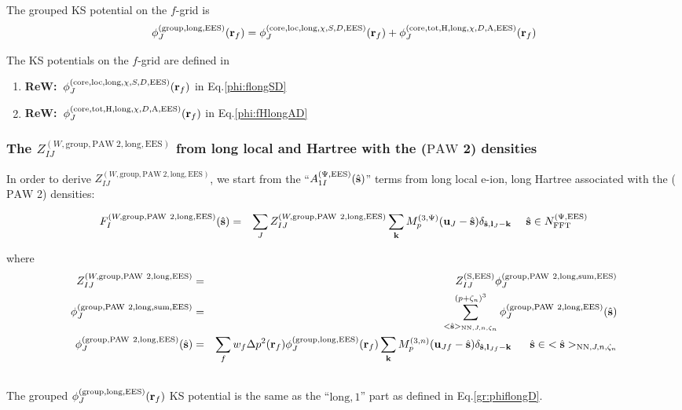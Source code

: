 \documentclass[paper=a4, fontsize=11pt]{article} %
\numberwithin{equation}{section} %
\numberwithin{figure}{section} %
\numberwithin{table}{section} %
\newcommand{\bu}{{\bf{u}}}
\newcommand{\bl}{{\bf{l}}}
\newcommand{\bk}{{\bf{k}}}
\newcommand{\bs}{{\bf{s}}}
\newcommand{\br}{{\bf{r}}}
\newcommand{\hs}{{\hat{\bf{s}}}}
\newcommand{\rS}{{\mathrm{S}}}
\newcommand{\rEES}{{\mathrm{EES}}}
\newcommand{\rgr}{{\mathrm{group}}}
\newcommand{\rcore}{{\mathrm{core}}}
\newcommand{\rNN}{{\mathrm{NN}}}
\newcommand{\rlong}{{\mathrm{long}}}
\newcommand{\rP}{{\mathrm{PAW}}}
\newcommand{\rH}{{\mathrm{H}}}
\newcommand{\rA}{{\mathrm{A}}}
\newcommand{\rsum}{{\mathrm{sum}}}
\newcommand{\rlo}{{\mathrm{loc}}}
\newcommand{\rtot}{{\mathrm{tot}}}
\newcommand{\NFFTpEES}{{N^{\mathrm{(\Psi,\rEES})}_{\mathrm{FFT}}}}
\newcommand{\Mp}{{M_p^{(3,\Psi)}}}
\newcommand{\pzn}{{(p+\zeta_n)^3}}
\newcommand{\hsJn}{{<\hs>_{\rNN,J,n,\zeta_n}}}
\newcommand{\hsinJn}{{\ \ \ \ \ \hs  \in  \hsJn}}
\newcommand{\hsinpEES}{{\ \ \ \ \hs \in \NFFTpEES}}
\newcommand{\ReW}{{{\bf ReW:\ }}}
\begin{document}
The grouped KS potential on the $f$-grid is 
\begin{equation}\label{gr:phiflongD}
\phi_J^{(\rgr,\rlong,\rEES)}(\br_f) = \phi_J^{(\rcore,\rlo,\rlong,\chi,S,D,\rEES)}(\br_f) + \phi_J^{(\rcore,\rtot,\rH,\rlong,\chi,D,\rA,\rEES)}(\br_f)
\end{equation}

The KS potentials on the $f$-grid are defined in
\begin{enumerate}
\item \ReW $\phi_J^{(\rcore,\rlo,\rlong,\chi,S,D,\rEES)}(\br_f)$ in Eq.\eqref{phi:flongSD}
\item \ReW $\phi_J^{(\rcore,\rtot,\rH,\rlong,\chi,D,\rA,\rEES)}(\br_f)$ in Eq.\eqref{phi:fHlongAD}
\end{enumerate}



\subsubsection{The $Z_{IJ}^{(W,\rgr,\rP\ 2,\rlong,\rEES)}$ from long local and Hartree with the ($\rP$ 2) densities}

In order to derive $Z_{IJ}^{(W,\rgr,\rP\ 2,\rlong,\rEES)}$, we start from the ``$A_{1I}^{(\Psi,\rEES)}(\hs) $'' terms from long local e-ion, long Hartree associated with the ($\rP$ 2) densities:

\begin{eqnarray}
F_I^{(W,\rgr,\rP\ 2,\rlong,\rEES)}(\hs) &=& \sum_J Z_{IJ}^{(W,\rgr,\rP\ 2,\rlong,\rEES)} \sum_{\bk} \Mp(\bu_{J}-\hat \bs) \delta_{\hat \bs,\bl_J-\bk} \hsinpEES
\end{eqnarray}

where
\begin{eqnarray}
\label{FIJ:long2}
Z_{IJ}^{(W,\rgr,\rP\ 2,\rlong,\rEES)} &=& Z_{IJ}^{(\rS,\rEES)}  \phi_J^{(\rgr,\rP\ 2,\rlong,\rsum,\rEES)} \\
\label{gr:philong2sum}
\phi_J^{(\rgr,\rP\ 2,\rlong,\rsum,\rEES)} &=& \sum_{\hsJn}^{\pzn} \phi_J^{(\rgr,\rP\ 2,\rlong,\rEES)}(\hs)\\
\phi_J^{(\rgr,\rP\ 2,\rlong,\rEES)}(\hs) &=& \sum_f w_f \Delta p^2(\br_f) \phi_J^{(\rgr,\rlong,\rEES)}(\br_f) \sum_{\bk}  M_p^{(3,n)}(\bu_{Jf}-\hat \bs)\delta_{\hat \bs,\bl_{Jf}-\bk} \hsinJn \nonumber\\
&\ &
\end{eqnarray}
The grouped $\phi_J^{(\rgr,\rlong,\rEES)}(\br_f)$ KS potential is the same as the ``$\rlong,1$'' part as defined in Eq.\eqref{gr:phiflongD}. \\
\end{document}
